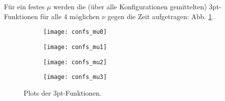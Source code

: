 \documentclass{article}
\begin{document}
{}

\pagestyle{fancy}

Für ein festes $\mu$ werden die (über alle Konfigurationen gemittelten) 3pt-Funktionen für alle 4 möglichen $\nu$ gegen die Zeit aufgetragen: Abb. \ref{fig:3pt}.
\begin{figure}
    \centering
    \begin{subfigure}{0.49\linewidth}
        \centering
        \texttt{[image: confs\_mu0]}
    \end{subfigure}
    \hfill
    \begin{subfigure}{0.49\textwidth}
        \centering
        \texttt{[image: confs\_mu1]}
    \end{subfigure}

    \begin{subfigure}{0.49\textwidth}
        \centering
        \texttt{[image: confs\_mu2]}
    \end{subfigure}
    \hfill
    \begin{subfigure}{0.49\textwidth}
        \centering
        \texttt{[image: confs\_mu3]}
    \end{subfigure}
    \caption{Plots der 3pt-Funktionen.}
    \label{fig:3pt}
\end{figure}
\end{document}
